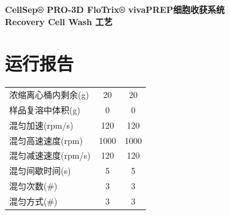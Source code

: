 \documentclass[UTF8,10pt,a4paper,fontset=fandol]{ctexart}
\newcommand{\fieldvalue}[1]{#1}
\begin{document}
\newpage

\begin{center}
\textbf{CellSep® PRO-3D FloTrix® vivaPREP细胞收获系统}\\
\textbf{Recovery Cell Wash 工艺}\\
\section*{运行报告}
\end{center}

\begin{tabularx}{\textwidth}{@{}>{\raggedright\arraybackslash}Xcc@{}}
浓缩离心桶内剩余(g) &
\fieldvalue{20} &
\fieldvalue{20} \\

样品复溶中体积(g) &
\fieldvalue{0} &
\fieldvalue{0} \\

混匀加速(rpm/s) &
\fieldvalue{120} &
\fieldvalue{120} \\

混匀高速速度(rpm) &
\fieldvalue{1000} &
\fieldvalue{1000} \\

混匀减速速度(rpm/s) &
\fieldvalue{120} &
\fieldvalue{120} \\

混匀间歇时间(s) &
\fieldvalue{5} &
\fieldvalue{5} \\

混匀次数(\#) &
\fieldvalue{3} &
\fieldvalue{3} \\

混匀方式(\#) &
\fieldvalue{3} &
\fieldvalue{3} \\


\end{tabularx}
\end{document}
